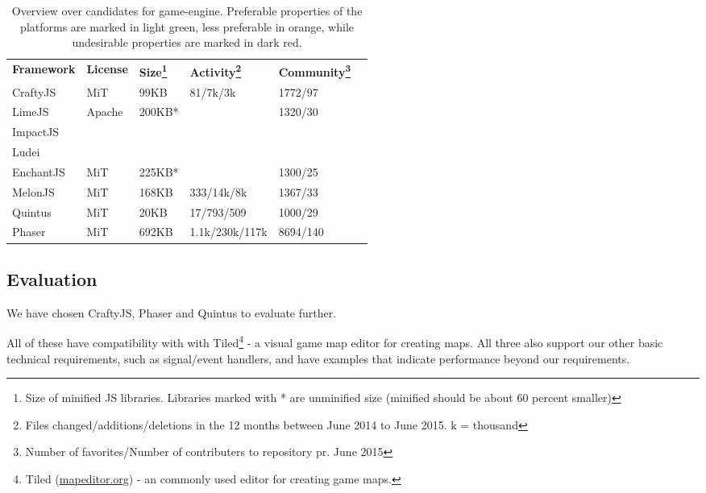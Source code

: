 \begin{table}[ht]
\begin{minipage}{\textwidth} 
\begin{tabular}{llllll}
{\bf Framework} & {\bf License} & {\bf Size\footnote{Size of minified JS libraries. Libraries marked with * are unminified size (minified should be about 60 percent smaller)}} & {\bf Activity\footnote{Files changed/additions/deletions in the 12 months between June 2014 to June 2015. k = thousand}} & {\bf Community\footnote{Number of favorites/Number of contributers to repository pr. June 2015}} \\
CraftyJS& \cellcolor[HTML]{CDFBCD}MiT & 99KB & \cellcolor[HTML]{CDFBCD}81/7k/3k   & \cellcolor[HTML]{CDFBCD}1772/97 \\
LimeJS & \cellcolor[HTML]{CDFBCD}Apache & 200KB* & \cellcolor[HTML]{de2d26} \textcolor{white}{5/54/21}  & \cellcolor[HTML]{CDFBCD}1320/30 \\
ImpactJS& \cellcolor[HTML]{de2d26} \textcolor{white}{Propr.} & & & \\
Ludei   & \cellcolor[HTML]{de2d26} \textcolor{white}{Propr.} & & & \\
EnchantJS & \cellcolor[HTML]{CDFBCD}MiT & 225KB* & \cellcolor[HTML]{de2d26} \textcolor{white}{19/202/282} & \cellcolor[HTML]{CDFBCD}1300/25 \\
MelonJS & \cellcolor[HTML]{CDFBCD}MiT & 168KB & \cellcolor[HTML]{CDFBCD}333/14k/8k & \cellcolor[HTML]{CDFBCD}1367/33 \\
Quintus & \cellcolor[HTML]{CDFBCD}MiT  & 20KB& \cellcolor[HTML]{FEB24C}17/793/509 & \cellcolor[HTML]{CDFBCD}1000/29 \\
Phaser & \cellcolor[HTML]{CDFBCD}MiT  & 692KB& \cellcolor[HTML]{CDFBCD}1.1k/230k/117k & \cellcolor[HTML]{CDFBCD}8694/140 \\

\end{tabular}
\caption {Overview over candidates for game-engine. Preferable properties of the platforms are marked in light green, less preferable in orange, while undesirable properties are marked in dark red.}
\end{minipage}
\end{table}
\subsection{Evaluation}
We have chosen CraftyJS, Phaser and Quintus to evaluate further. 

All of these have compatibility with with Tiled\footnote{Tiled (\href{http://mapeditor.org}{mapeditor.org}) - an commonly used editor for creating game maps.} - a visual game map editor for creating maps. All three also support our other basic technical requirements, such as signal/event handlers, and have examples that indicate performance beyond our requirements.

